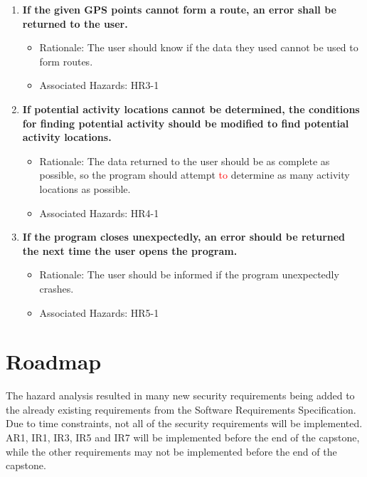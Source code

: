 \documentclass{article}
\begin{document}
\begin{enumerate}[{IR}1. ]
\item \label{IR5} \textbf{If the given GPS points cannot form a route, an error shall be returned to the user.}
    \begin{itemize} 
        \item Rationale: The user should know if the data they used cannot be used to form routes.
         \item Associated Hazards: HR3-1
    \end{itemize}
\item \label{IR6} \textbf{If potential activity locations cannot be determined, the conditions for finding potential activity should be modified to find potential activity locations.}
    \begin{itemize} 
        \item Rationale: The data returned to the user should be as complete as possible, so the program should attempt \textcolor{red}{to} determine as many activity locations as possible.
         \item Associated Hazards: HR4-1
    \end{itemize} 
\item \label{IR7} \textbf{If the program closes unexpectedly, an error should be returned the next time the user opens the program.}
    \begin{itemize} 
        \item Rationale: The user should be informed if the program unexpectedly crashes.
         \item Associated Hazards: HR5-1
    \end{itemize} 
\end{enumerate}

\section{Roadmap}
The hazard analysis resulted in many new security requirements being added to the already existing requirements from the Software Requirements Specification. Due to time constraints, not all of the security requirements will be implemented. AR1, IR1, IR3, IR5 and IR7 will be implemented before the end of the capstone, while the other requirements may not be implemented before the end of the capstone.
\end{document}
